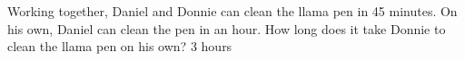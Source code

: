 {Working together, Daniel and Donnie can clean the llama pen in 45 minutes.  On his own, Daniel can clean the pen in an hour.  How long does it take Donnie to clean the llama pen on his own?}
{3 hours}